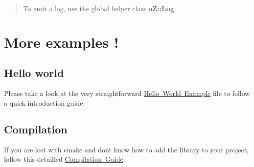 \begin{quote}
To emit a log, use the global helper class {\bfseries{o\+Z\+::\+Log}}. \end{quote}


\section*{More examples !}

\subsection*{Hello world}

Please take a look at the very straightforward \mbox{\hyperlink{md_HELLO}{Hello World Example}} file to follow a quick introduction guide.

\subsection*{Compilation}

If you are lost with cmake and don\textquotesingle{}t know how to add the library to your project, follow this detailled \mbox{\hyperlink{md_COMPILATION}{Compilation Guide}}. 